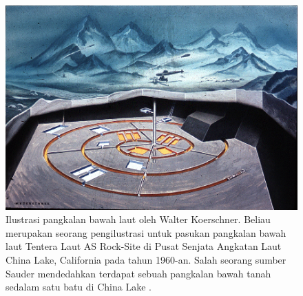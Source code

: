 \documentclass[10pt,twocolumn,letterpaper]{article}
\begin{document}
\begin{figure}[t]
\begin{center}
   \includegraphics[width=1\linewidth]{undersea.jpg}
\end{center}
   \caption{Ilustrasi pangkalan bawah laut oleh Walter Koerschner. Beliau merupakan seorang pengilustrasi untuk pasukan pangkalan bawah laut Tentera Laut AS Rock-Site di Pusat Senjata Angkatan Laut China Lake, California pada tahun 1960-an. Salah seorang sumber Sauder mendedahkan terdapat sebuah pangkalan bawah tanah sedalam satu batu di China Lake \cite{22,23}.}
\label{fig:5}
\label{fig:onecol}
\end{figure}
\end{document}
